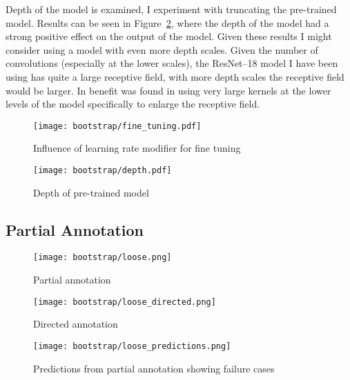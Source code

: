 Depth of the model is examined, I experiment with truncating the pre-trained model. Results can be seen in Figure~\ref{fig:bootstrap_depth}, where the depth of the model had a strong positive effect on the output of the model. Given these results I might consider using a model with even more depth scales. Given the number of convolutions (especially at the lower scales), the ResNet--18 model I have been using has quite a large receptive field, with more depth scales the receptive field would be larger. In \cite{Peng2017} benefit was found in using very large kernels at the lower levels of the model specifically to enlarge the receptive field.

\begin{figure*}[!ht]
\centering
\begin{subfigure}{.5\textwidth}
  \centering
  \texttt{[image: bootstrap/fine\_tuning.pdf]}
  \caption{Influence of learning rate modifier for fine tuning}  
  \label{fig:bootstrap_fine}
\end{subfigure}%
\begin{subfigure}{.5\textwidth}
  \centering
  \texttt{[image: bootstrap/depth.pdf]}
  \caption{Depth of pre-trained model}  
  \label{fig:bootstrap_depth}
\end{subfigure}

\label{fig:bootstrap_training}
\end{figure*}




\subsection {Partial Annotation}


\begin{figure*}[!ht]
\centering
\begin{subfigure}[t]{.3\textwidth}
  \centering
  \texttt{[image: bootstrap/loose.png]}
  \caption{Partial annotation}
  \label{fig:bootstrap_loose_annot}
\end{subfigure}%
\begin{subfigure}[t]{.3\textwidth}
  \centering
  \texttt{[image: bootstrap/loose\_directed.png]}
  \caption{Directed annotation}
  \label{fig:bootstrap_loose_dir}

\end{subfigure}%
\begin{subfigure}[t]{.3\textwidth}
  \centering
  \texttt{[image: bootstrap/loose\_predictions.png]}
  \caption{Predictions from partial annotation showing failure cases}
  \label{fig:bootstrap_loose_pred}
\end{subfigure}
  \caption{Loose annotation methods, red overlay refers to pixels labelled as background where transparent pixels are unlabelled}


\end{figure*}

